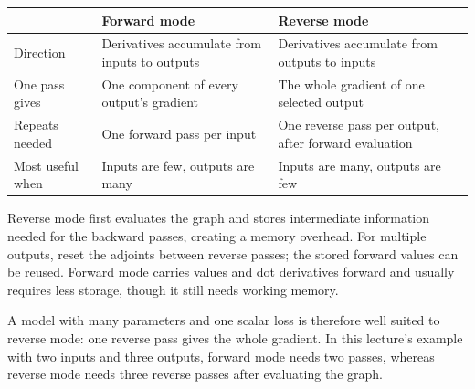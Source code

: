 \begin{center}
\renewcommand{\arraystretch}{1.35}
\begin{tabular}{
  >{\raggedright\arraybackslash}p{2.5cm}
  >{\raggedright\arraybackslash}p{4.8cm}
  >{\raggedright\arraybackslash}p{4.8cm}
}
\toprule
 & Forward mode & Reverse mode\\
\midrule
Direction
 & Derivatives accumulate from inputs to outputs
 & Derivatives accumulate from outputs to inputs\\
One pass gives
 & One component of every output's gradient
 & The whole gradient of one selected output\\
Repeats needed
 & One forward pass per input
 & One reverse pass per output, after forward evaluation\\
Most useful when
 & Inputs are few, outputs are many
 & Inputs are many, outputs are few\\
\bottomrule
\end{tabular}
\end{center}

Reverse mode first evaluates the graph and stores intermediate information needed for the backward passes, creating a memory overhead. For multiple outputs, reset the adjoints between reverse passes; the stored forward values can be reused. Forward mode carries values and dot derivatives forward and usually requires less storage, though it still needs working memory.

A model with many parameters and one scalar loss is therefore well suited to reverse mode: one reverse pass gives the whole gradient. In this lecture's example with two inputs and three outputs, forward mode needs two passes, whereas reverse mode needs three reverse passes after evaluating the graph.